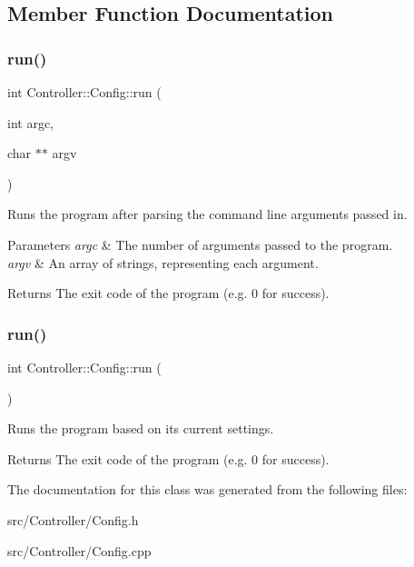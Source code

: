 \subsection{Member Function Documentation}
\mbox{\label{classController_1_1Config_ac37d92603bcd7a4f27e64b92a9cff1c0}} 
\subsubsection{\texorpdfstring{run()}{run()}\hspace{0.1cm}{\footnotesize\ttfamily [1/2]}}
{\footnotesize\ttfamily int Controller\+::\+Config\+::run (\begin{DoxyParamCaption}\item[{int}]{argc,  }\item[{char $\ast$$\ast$}]{argv }\end{DoxyParamCaption})}



Runs the program after parsing the command line arguments passed in. 


\begin{DoxyParams}{Parameters}
{\em argc} & The number of arguments passed to the program. \\
\hline
{\em argv} & An array of strings, representing each argument. \\
\hline
\end{DoxyParams}
\begin{DoxyReturn}{Returns}
The exit code of the program (e.\+g. 0 for success). 
\end{DoxyReturn}
\mbox{\label{classController_1_1Config_adcbaa24721e3f3db508c93301b75a49c}} 
\subsubsection{\texorpdfstring{run()}{run()}\hspace{0.1cm}{\footnotesize\ttfamily [2/2]}}
{\footnotesize\ttfamily int Controller\+::\+Config\+::run (\begin{DoxyParamCaption}{ }\end{DoxyParamCaption})}



Runs the program based on its current settings. 

\begin{DoxyReturn}{Returns}
The exit code of the program (e.\+g. 0 for success). 
\end{DoxyReturn}


The documentation for this class was generated from the following files\+:\begin{DoxyCompactItemize}
\item 
src/\+Controller/Config.\+h\item 
src/\+Controller/Config.\+cpp\end{DoxyCompactItemize}
